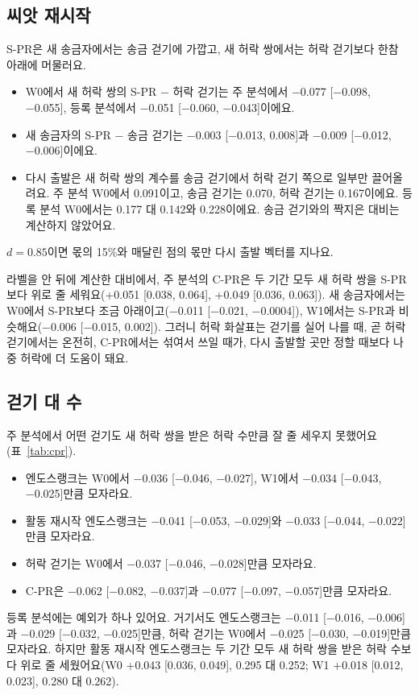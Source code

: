 \subsection{씨앗 재시작}

S-PR은 새 송금자에서는 송금 걷기에 가깝고, 새 허락 쌍에서는 허락 걷기보다 한참 아래에 머물러요.
\begin{itemize}
\item W0에서 새 허락 쌍의 S-PR − 허락 걷기는 주 분석에서 −0.077 [−0.098, −0.055], 등록 분석에서 −0.051 [−0.060, −0.043]이에요.
\item 새 송금자의 S-PR − 송금 걷기는 −0.003 [−0.013, 0.008]과 −0.009 [−0.012, −0.006]이에요.
\item 다시 출발은 새 허락 쌍의 계수를 송금 걷기에서 허락 걷기 쪽으로 일부만 끌어올려요. 주 분석 W0에서 0.091이고, 송금 걷기는 0.070, 허락 걷기는 0.167이에요. 등록 분석 W0에서는 0.177 대 0.142와 0.228이에요. 송금 걷기와의 짝지은 대비는 계산하지 않았어요.
\end{itemize}
$d=0.85$이면 몫의 15\%와 매달린 점의 몫만 다시 출발 벡터를 지나요.

라벨을 안 뒤에 계산한 대비에서, 주 분석의 C-PR은 두 기간 모두 새 허락 쌍을 S-PR보다 위로 줄 세워요(+0.051 [0.038, 0.064], +0.049 [0.036, 0.063]). 새 송금자에서는 W0에서 S-PR보다 조금 아래이고(−0.011 [−0.021, −0.0004]), W1에서는 S-PR과 비슷해요(−0.006 [−0.015, 0.002]). 그러니 허락 화살표는 걷기를 실어 나를 때, 곧 허락 걷기에서는 온전히, C-PR에서는 섞여서 쓰일 때가, 다시 출발할 곳만 정할 때보다 나중 허락에 더 도움이 돼요.

\subsection{걷기 대 수}
\label{sec:counts}

주 분석에서 어떤 걷기도 새 허락 쌍을 받은 허락 수만큼 잘 줄 세우지 못했어요(표~\ref{tab:cpr}).
\begin{itemize}
\item 엔도스랭크는 W0에서 −0.036 [−0.046, −0.027], W1에서 −0.034 [−0.043, −0.025]만큼 모자라요.
\item 활동 재시작 엔도스랭크는 −0.041 [−0.053, −0.029]와 −0.033 [−0.044, −0.022]만큼 모자라요.
\item 허락 걷기는 W0에서 −0.037 [−0.046, −0.028]만큼 모자라요.
\item C-PR은 −0.062 [−0.082, −0.037]과 −0.077 [−0.097, −0.057]만큼 모자라요.
\end{itemize}
등록 분석에는 예외가 하나 있어요. 거기서도 엔도스랭크는 −0.011 [−0.016, −0.006]과 −0.029 [−0.032, −0.025]만큼, 허락 걷기는 W0에서 −0.025 [−0.030, −0.019]만큼 모자라요. 하지만 활동 재시작 엔도스랭크는 두 기간 모두 새 허락 쌍을 받은 허락 수보다 위로 줄 세웠어요(W0 +0.043 [0.036, 0.049], 0.295 대 0.252; W1 +0.018 [0.012, 0.023], 0.280 대 0.262).

